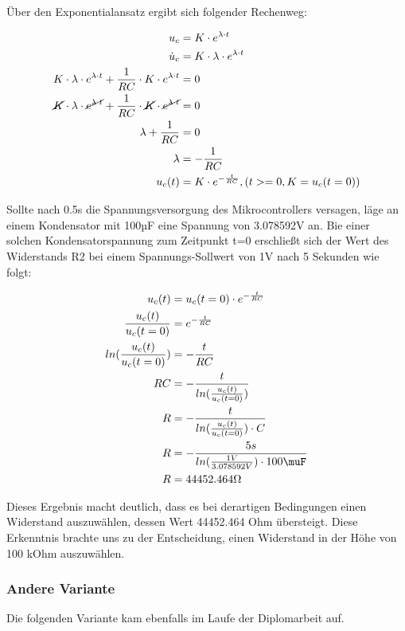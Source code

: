 Über den Exponentialansatz ergibt sich folgender Rechenweg:

\begin{align*}
    u_c &= K \cdot e^{\lambda \cdot t} \\
    \dot{u}_c &= K \cdot \lambda \cdot e^{\lambda \cdot t} \\
    K \cdot \lambda \cdot e^{\lambda \cdot t} + \frac{1}{RC} \cdot K \cdot e^{\lambda \cdot t} &= 0 \\
    \cancel{K} \cdot \lambda \cdot \cancel{e^{\lambda \cdot t}} + \frac{1}{RC} \cdot \cancel{K} \cdot \cancel{e^{\lambda \cdot t}} &= 0 \\
    \lambda + \frac{1}{RC} &= 0 \\
    \lambda &= -\frac{1}{RC} \\
    u_c(t) &= K \cdot e^{-\frac{t}{RC}}, (t >= 0, K = u_c(t=0)) \\
\end{align*}

Sollte nach 0.5s die Spannungsversorgung des Mikrocontrollers versagen, läge an einem Kondensator mit 100µF eine Spannung von 3.078592V an.
Bie einer solchen Kondensatorspannung zum Zeitpunkt t=0 erschließt sich der
Wert des Widerstands R2 bei einem Spannungs-Sollwert von 1V nach 5 Sekunden wie folgt:

\begin{align*}
    u_c(t) &= u_c(t=0) \cdot e^{-\frac{t}{RC}} \\
    \frac{u_c(t)}{u_c(t=0)} &= e^{-\frac{t}{RC}} \\
    ln(\frac{u_c(t)}{u_c(t=0)}) &= -\frac{t}{RC} \\
    RC &= -\frac{t}{ln(\frac{u_c(t)}{u_c(t=0)})} \\
    R &= -\frac{t}{ln(\frac{u_c(t)}{u_c(t=0)}) \cdot C} \\
    R &= -\frac{5s}{ln(\frac{1V}{3.078592V}) \cdot 100\muF} \\
    R &=  44452.464\Omega
\end{align*}

Dieses Ergebnis macht deutlich, dass es bei derartigen Bedingungen einen Widerstand auszuwählen, dessen Wert 44452.464 Ohm übersteigt.
Diese Erkenntnis brachte uns zu der Entscheidung, einen Widerstand in der Höhe von 100 kOhm auszuwählen.

\newpage

\subsubsection{Andere Variante}
Die folgenden Variante kam ebenfalls im Laufe der Diplomarbeit auf.

